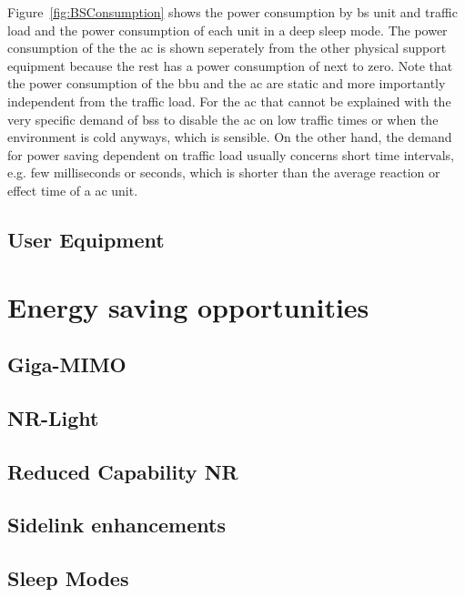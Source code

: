 \documentclass[11pt,a4paper]{article}
\begin{document}
Figure~\ref{fig:BSConsumption} shows the power consumption by \acrshort{bs} unit and traffic load and the power consumption of each unit in a deep sleep mode.
The power consumption of the the \acrshort{ac} is shown seperately from the other physical support equipment because the rest has a power consumption of next to zero.  
Note that the power consumption of the \acrshort*{bbu} and the \acrshort{ac} are static and more importantly independent from the traffic load.
For the \acrlong{ac} that cannot be explained with the very specific demand of \acrlong{bs}s to disable the \acrshort{ac} on low traffic times or when the environment is cold anyways, which is sensible.
On the other hand, the demand for power saving dependent on traffic load usually concerns short time intervals, e.g. few milliseconds or seconds, which is shorter than the average reaction or effect time of a \acrlong{ac} unit.

\subsection{User Equipment}\label{subsec:UEConsumption}


\section{Energy saving opportunities}\label{sec:opportunities}


\subsection{Giga-MIMO}\label{subsec:gigamimo}
\subsection{NR-Light}\label{subsec:nrlight}
\subsection{Reduced Capability NR}\label{subsec:RedCap}
\subsection{Sidelink enhancements}\label{subsec:sidelink}
\subsection{Sleep Modes}\label{subsec:sleep}
\end{document}
